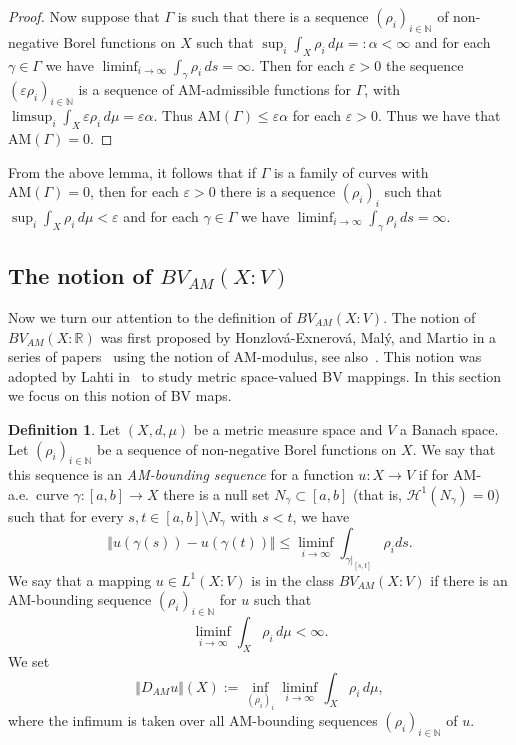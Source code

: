 \documentclass[11pt, letterpaper]{amsart} %
\newcommand*{\R}{{\mathbb R}}
\newcommand*{\N}{{\mathbb N}}
\newcommand*{\eps}{\varepsilon}
\newcommand*{\AM}{\text{AM}}
\numberwithin{equation}{section}
\theoremstyle{plain}
\theoremstyle{definition}
\newtheorem{definition}[equation]{Definition}
\begin{document}
{\begin{proof}
Now suppose that $\Gamma$ is such that there is a sequence $(\rho_i)_{i\in\N}$ of non-negative Borel
functions on $X$ such that $\sup_i\int_X\rho_i\, d\mu=:\alpha<\infty$ and for each $\gamma\in\Gamma$
we have $\liminf_{i\to\infty}\int_\gamma\rho_i\, ds=\infty$. Then for each $\eps>0$ the sequence
$(\eps \rho_i)_{i\in\N}$ is a sequence of AM-admissible functions for $\Gamma$, with
$\limsup_i\int_X \eps\rho_i\, d\mu=\eps\alpha$. Thus 
$\AM(\Gamma)\le \eps\alpha$ for each $\eps>0$. Thus we have that $\AM(\Gamma)=0$.
\end{proof}


From the above lemma, it follows that if $\Gamma$ is a family of curves with 
$\mathrm{AM}(\Gamma)=0$, then for each $\varepsilon>0$ there is a
sequence $(\rho_i)_i$ such that $\sup_i\int_X\rho_i\, d\mu<\varepsilon$ and for each 
$\gamma\in\Gamma$ we have $\liminf_{i\to\infty}\int_\gamma\rho_i\, ds=\infty$.



\subsection{The notion of $BV_{AM}(X:V)$}

Now we turn our attention to the definition of $BV_{AM}(X:V)$. The notion of $BV_{AM}(X:\R)$ was first proposed by
Honzlov\'a-Exnerov\'a, Mal\'y, and Martio in a series of papers~\cite{HMM-1, HMM-2, HMM-3} using the notion of AM-modulus,
see also~\cite{HKMM}. This notion was adopted by Lahti in~\cite{Lah1} to study metric space-valued BV mappings.
In this section we focus on this notion of BV maps.


\begin{definition}
Let $(X,d,\mu )$ be a metric measure space and $V$ a Banach space. 
Let $(\rho_i)_{i\in\N}$ be a sequence of non-negative Borel functions on $X$. We say that this sequence is an
\emph{AM-bounding sequence} for a function $u:X\to V$ if 
for AM-a.e.~curve $\gamma:[a,b]\to X$ 
there is a null set $N_\gamma\subset[a,b]$ (that is, $\mathcal{H}^1(N_\gamma)=0$) such that for every 
$s,t\in [a,b]\setminus N_\gamma$ with $s<t$, we have 
\begin{equation}\label{eq:AMBV}
\Vert u(\gamma (s))-u(\gamma (t))\Vert\leq\liminf_{i\to\infty}\int_{\gamma|_{[s,t]}}\rho_i ds.
\end{equation}
We say that a mapping $u\in L^1(X:V)$ is in the class $BV_{AM}(X:V)$ if there is an AM-bounding sequence $(\rho_i)_{i\in\N}$ for
$u$ such that
\[
\liminf_{i\to\infty}\int_X\rho_i\, d\mu<\infty.
\] 
We set
\[
\Vert D_{AM}u\Vert (X):=\inf_{(\rho_i)_i}\liminf_{i\to\infty}\int_X\rho_i\,d\mu ,
\]
where the infimum is taken over all AM-bounding sequences $(\rho_i)_{i\in\N}$ of $u$.
\end{definition}

}
\end{document}

